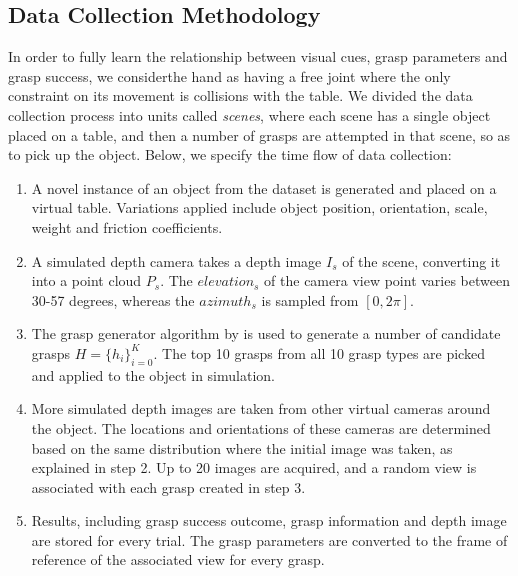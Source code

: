 \subsection{Data Collection Methodology}
\label{subsection:dataCollection}

In order to fully learn the relationship between visual cues, grasp parameters and grasp success, we  considerthe hand as having a free joint where the only constraint on its movement is collisions with the table. We divided the data collection process into units called \textit{scenes}, where each scene has a single object placed on a table, and then a number of grasps are attempted in that scene, so as to pick up the object. Below, we specify the time flow of data collection:

\begin{enumerate}
\item A novel instance of an object from the dataset is generated and placed on a virtual table. Variations applied include object position, orientation, scale, weight and friction coefficients.
\item A simulated depth camera takes a depth image $I_s$ of the scene, converting it into a point cloud $P_s$. The ${elevation}_s$ of the camera view point varies between 30-57 degrees, whereas the ${azimuth}_s$ is sampled from $[0, 2\pi]$. 
\item The grasp generator algorithm by \citet{kopicki2015ijrr} is used to generate a number of candidate grasps $H = \{h_i\}_{i=0}^{K}$. The top 10 grasps from all 10 grasp types are picked and applied to the object in simulation.
\item More simulated depth images are taken from other virtual cameras around the object. The locations and orientations of these cameras are determined based on the same distribution where the initial image was taken, as explained in step 2. Up to 20 images are acquired, and a random view is associated with each grasp created in step 3. 
\item Results, including grasp success outcome, grasp information and depth image are stored for every trial. The grasp parameters are converted to the frame of reference of the associated view for every grasp.
\end{enumerate}


